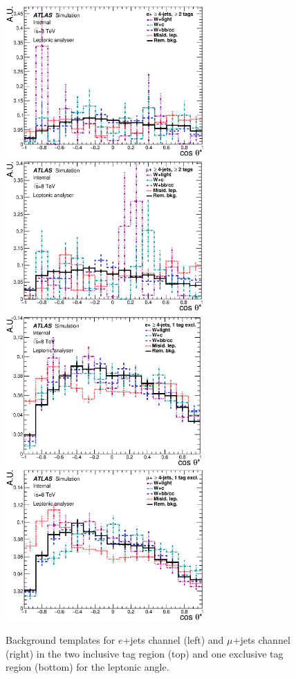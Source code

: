 \begin{figure}[!hb]
  \begin{center}
    
    \includegraphics[height=58mm]{chapters/whel/figures/templatePlots/Leptonic/Background_Templates_2incl_el_lep}
    \includegraphics[height=58mm]{chapters/whel/figures/templatePlots/Leptonic/Background_Templates_2incl_mu_lep}\\
    \includegraphics[height=58mm]{chapters/whel/figures/templatePlots/Leptonic/Background_Templates_1excl_el_lep}
    \includegraphics[height=58mm]{chapters/whel/figures/templatePlots/Leptonic/Background_Templates_1excl_mu_lep}
    \caption{Background templates for $e$+jets channel (left) and $\mu$+jets channel (right) in the two inclusive \bt tag region (top) and one exclusive \bt tag region (bottom) for the leptonic angle.}
    \label{fig:Bkg_temp_lep}
\end{center}
\end{figure}

